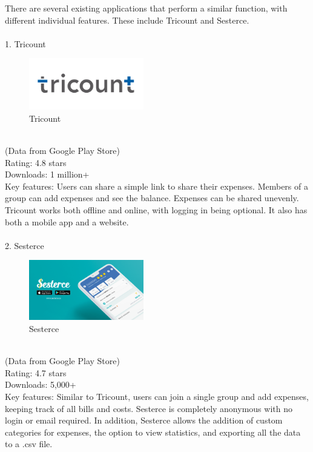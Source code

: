 \documentclass[conference]{IEEEtran}
\begin{document}
There are several existing applications that perform a similar function, with different individual features. These include Tricount and Sesterce.
\\
\\
1. Tricount
\begin{figure}[htbp]
    \centerline{\includegraphics[width=50mm,scale=0.5]{img/logo-tricount.png}}
    \caption{Tricount}
    \label{fig:my_label}
\end{figure}
\\
(Data from Google Play Store) \\
Rating: 4.8 stars \\
Downloads: 1 million+ \\
Key features: Users can share a simple link to share their expenses. Members of a group can add expenses and see the balance. Expenses can be shared unevenly. Tricount works both offline and online, with logging in being optional. It also has both a mobile app and a website.
\\
\\
2. Sesterce
\begin{figure}[htbp]
    \centerline{\includegraphics[width=50mm,scale=0.5]{img/logo-sesterce.png}}
    \caption{Sesterce}
    \label{fig:my_label}
\end{figure}
\\
(Data from Google Play Store) \\
Rating: 4.7 stars \\
Downloads: 5,000+ \\
Key features: Similar to Tricount, users can join a single group and add expenses, keeping track of all bills and costs. Sesterce is completely anonymous with no login or email required. In addition, Sesterce allows the addition of custom categories for expenses, the option to view statistics, and exporting all the data to a .csv file.
\end{document}

